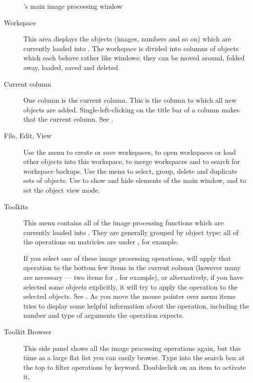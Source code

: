 \begin{figure}
\caption{\nip{}'s main image processing window}
\end{figure}

\begin{description}

\item[Workspace]
This area displays the objects (images, numbers and so on) which
are currently loaded into \nip{}. The workspace is divided into columns of
objects which each behave rather like windows: they can be moved around,
folded away, loaded, saved and deleted. 

\item[Current column]
One column is the current column. This is the column to
which all new objects are added. Single-left-clicking on the title bar of
a column makes that the current column. See .

\item[File, Edit, View]
Use the  menu to create or save work\-spaces, to open workspaces
or load other objects into this workspace, to merge workspaces and to search
for workspace backups.  Use the  menu to select, group, delete and
duplicate sets of objects.  Use  to show and hide elements of the
main window, and to set the object view mode.

\item[Toolkits]
This menu contains all of the image processing functions which are currently
loaded into \nip{}. They are generally grouped by object type: all of the
operations on matricies are under , for example.

If you select one of these image processing operations, \nip{} will apply
that operation to the bottom few items in the current column (however many are
necessary --- two items for , for example),
or alternatively, if you have selected some objects explicitly, it will try
to apply the operation to the selected objects. See . As
you move the mouse pointer over menu items \nip{} tries to display some
helpful information about the operation, including the number and type of
arguments the operation expects.

\item[Toolkit Browser]
This side panel shows all the image processing operations again, but this time
as a large flat list you can easily browse. Type into the search box at the
top to filter operations by keyword. Doubleclick on an item to activate it.


\end{description}
